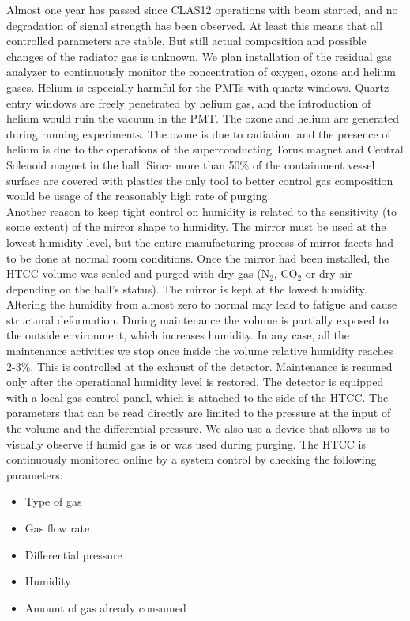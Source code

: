 Almost one year has passed since CLAS12 operations with beam started, and no degradation of signal strength has been observed. At least this means that all controlled parameters are stable. But still actual composition and possible changes of the radiator gas is unknown. We plan installation of the residual gas analyzer to  continuously monitor the concentration of oxygen, ozone and helium gases. Helium is especially harmful for the PMTs with quartz windows. Quartz entry windows are freely penetrated by helium gas, and the introduction of helium would ruin the vacuum in the PMT. The ozone and helium are generated during running experiments. The ozone is due to radiation, and the presence of helium is due to the operations of the superconducting Torus magnet and Central Solenoid magnet in the hall. Since more than 50\% of the containment vessel surface are covered with plastics the only tool to better control gas composition would be usage of the reasonably high rate of purging.
\\
\indent Another reason to keep tight control on humidity is related to the sensitivity (to some extent) of the mirror shape to humidity. The mirror must be used at the lowest humidity level, but the entire manufacturing process of mirror facets had to be done at normal room conditions. Once the mirror had been installed, the HTCC volume was sealed and purged with dry gas (N${_2}$, CO${_2}$ or dry air depending on the hall's status). The mirror is kept at the lowest humidity. Altering the humidity from almost zero to normal may lead to fatigue and cause structural deformation. During maintenance the volume is partially exposed to the outside environment, which increases humidity. In any case, all the maintenance activities we stop once inside the volume relative humidity reaches 2-3\%. This is controlled at the exhaust of the detector. Maintenance is resumed only after the operational humidity level is restored. The detector is equipped with a local gas control panel, which is attached to the side of the HTCC. The parameters that can be read directly are limited to the pressure at the input of the volume and the differential pressure. We also use a device that allows us to visually observe if humid gas is or was used during purging. The HTCC is continuously monitored online by a system control by checking the following parameters:

\begin{itemize}
    \item Type of gas
    \item Gas flow rate
    \item Differential pressure
    \item Humidity
    \item Amount of gas already consumed
\end{itemize}

